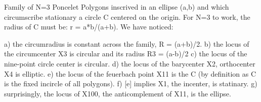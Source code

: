 Family of N=3 Poncelet Polygons inscrived in an ellipse (a,b) and which circumscribe stationary a circle C centered on the origin. For N=3 to work, the radius of C must be: r = a*b/(a+b). We have noticed:

a) the circumradius is constant across the family, R = (a+b)/2.
b) the locus of the circumcenter X3 is circular and its radius R3 = (a-b)/2
c) the locus of the nine-point circle center is circular. 
d) the locus of the barycenter X2, orthocenter X4 is elliptic.
e) the locus of the feuerbach point X11 is the C (by definition as C is the fixed incircle of all polygons). 
f) [e] implies X1, the incenter, is statinary.
g) surprisingly, the locus of X100, the anticomplement of X11, is the ellipse.